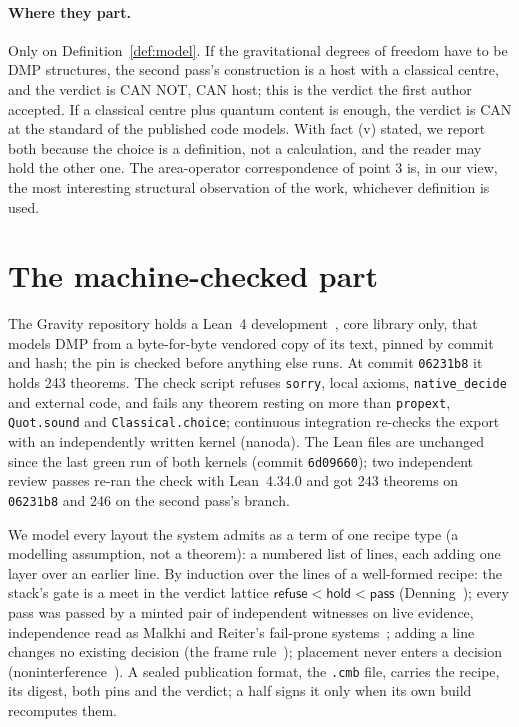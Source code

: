 \documentclass[11pt,a4paper]{article}
\theoremstyle{definition}
\theoremstyle{remark}
\newcommand{\lean}[1]{\texttt{#1}}
\begin{document}
\paragraph{Where they part.} Only on Definition~\ref{def:model}. If the gravitational degrees of freedom have to be DMP structures, the
second pass's construction is a host with a classical centre, and the verdict is CAN NOT, CAN host; this is the verdict the first author
accepted. If a classical centre plus quantum content is
enough, the verdict is CAN at the standard of the published code models. With fact (v) stated, we report both because the choice is a
definition, not a calculation, and the reader may hold the other one. The area-operator correspondence of point 3 is, in our view, the most interesting
structural observation of the work, whichever definition is used.

\section{The machine-checked part}\label{sec:lean}

The Gravity repository holds a Lean~4 development~\cite{lean4}, core library only, that models DMP from a byte-for-byte vendored copy of
its text, pinned by commit and hash; the pin is checked before anything else runs. At commit \texttt{06231b8} it holds 243 theorems. The
check script refuses \texttt{sorry}, local axioms, \texttt{native\_decide} and external code, and fails any theorem resting on more than
\lean{propext}, \lean{Quot.sound} and \lean{Classical.choice}; continuous integration re-checks the export with an independently written
kernel (nanoda). The Lean files are unchanged since the last green run of both kernels (commit \texttt{6d09660}); two independent
review passes re-ran the check with Lean~4.34.0 and got 243 theorems on \texttt{06231b8} and 246 on the second pass's branch.

We model every layout the system admits as a term of one recipe type (a modelling assumption, not a theorem): a numbered list of lines, each adding one layer
over an earlier line. By induction over the lines of a well-formed recipe: the stack's gate is a meet in the verdict lattice
$\textsf{refuse}<\textsf{hold}<\textsf{pass}$ (Denning~\cite{denning}); every pass was passed by a minted pair of independent witnesses
on live evidence, independence read as Malkhi and Reiter's fail-prone systems~\cite{mr}; adding a line changes no existing decision (the
frame rule~\cite{ohearn}); placement never enters a decision (noninterference~\cite{gm}). A sealed publication format, the
\texttt{.cmb} file, carries the recipe, its digest, both pins and the verdict; a half signs it only when its own build recomputes them.
\end{document}

